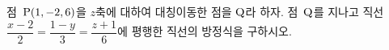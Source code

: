 점~$\mathrm{P}(1{,}\mkern3mu\mathopen{}-2{,}\mkern3mu\mathopen{}6)$을 $z$축에 대하여 대칭이동한 점을 $\mathrm{Q}$라 하자. 점~$\mathrm{Q}$를 지나고 직선 $\dfrac{x-2}{2}=\dfrac{1-y}{3}=\dfrac{z+1}{6}$에 평행한 직선의 방정식을 구하시오.
